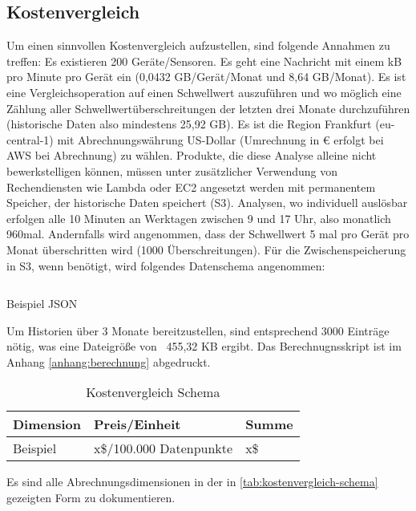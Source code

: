 \subsection{Kostenvergleich}
Um einen sinnvollen Kostenvergleich aufzustellen, sind folgende Annahmen zu treffen:
Es existieren 200 Geräte/Sensoren. Es geht eine Nachricht mit einem kB pro Minute pro Gerät ein (0,0432 GB/Gerät/Monat und 8,64 GB/Monat).
Es ist eine Vergleichsoperation auf einen Schwellwert auszuführen und wo möglich eine Zählung aller Schwellwertüberschreitungen der letzten drei Monate durchzuführen (historische Daten also mindestens 25,92 GB).  Es ist die Region Frankfurt (eu-central-1) mit Abrechnungswährung US-Dollar (Umrechnung in € erfolgt bei \ac{AWS} bei Abrechnung) zu wählen. Produkte, die diese Analyse alleine nicht bewerkstelligen können, müssen unter zusätzlicher Verwendung von Rechendiensten wie Lambda oder \ac{EC2} angesetzt werden mit permanentem Speicher, der historische Daten speichert (\ac{S3}). Analysen, wo individuell auslösbar erfolgen alle 10 Minuten an Werktagen zwischen 9 und 17 Uhr, also monatlich 960mal. Andernfalls wird angenommen, dass der Schwellwert 5 mal pro Gerät pro Monat überschritten wird (1000 Überschreitungen).
Für die Zwischenspeicherung in S3, wenn benötigt, wird folgendes Datenschema angenommen:

\begin{listing}[H]
\inputminted[frame=lines,breaklines=true]{json}{code/estimates/filtered-estimate.json}
\caption[Beispiel JSON]{Beispiel \ac{JSON}}
\label{listing:json}
\end{listing}
Um Historien über 3 Monate bereitzustellen, sind entsprechend 3000 Einträge nötig, was eine Dateigröße von ~455,32 KB ergibt. Das Berechnugnsskript ist im Anhang \ref{anhang:berechnung} abgedruckt.


\begin{table}[H]
\centering
\begin{tabular}{|l|l|l|}
\hline
Dimension & Preis/Einheit           & Summe \\ \hline
Beispiel  & x\$/100.000 Datenpunkte & x\$  \\\hline
\end{tabular}
\caption{Kostenvergleich Schema}
\label{tab:kostenvergleich-schema}
\end{table}
Es sind alle Abrechnungsdimensionen in der in \autoref{tab:kostenvergleich-schema} gezeigten Form zu dokumentieren.
